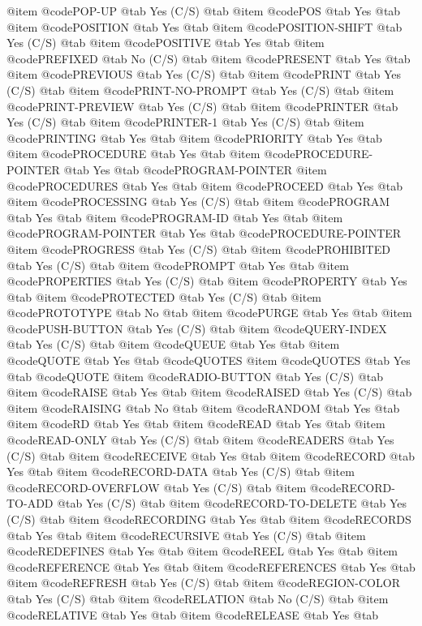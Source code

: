 @item @code{POP-UP} @tab Yes	(C/S) @tab 
@item @code{POS} @tab Yes @tab 
@item @code{POSITION} @tab Yes @tab 
@item @code{POSITION-SHIFT} @tab Yes	(C/S) @tab 
@item @code{POSITIVE} @tab Yes @tab 
@item @code{PREFIXED} @tab No	(C/S) @tab 
@item @code{PRESENT} @tab Yes @tab 
@item @code{PREVIOUS} @tab Yes	(C/S) @tab 
@item @code{PRINT} @tab Yes	(C/S) @tab 
@item @code{PRINT-NO-PROMPT} @tab Yes	(C/S) @tab 
@item @code{PRINT-PREVIEW} @tab Yes	(C/S) @tab 
@item @code{PRINTER} @tab Yes	(C/S) @tab 
@item @code{PRINTER-1} @tab Yes	(C/S) @tab 
@item @code{PRINTING} @tab Yes @tab 
@item @code{PRIORITY} @tab Yes @tab 
@item @code{PROCEDURE} @tab Yes @tab 
@item @code{PROCEDURE-POINTER} @tab Yes @tab @code{PROGRAM-POINTER}
@item @code{PROCEDURES} @tab Yes @tab 
@item @code{PROCEED} @tab Yes @tab 
@item @code{PROCESSING} @tab Yes	(C/S) @tab 
@item @code{PROGRAM} @tab Yes @tab 
@item @code{PROGRAM-ID} @tab Yes @tab 
@item @code{PROGRAM-POINTER} @tab Yes @tab @code{PROCEDURE-POINTER}
@item @code{PROGRESS} @tab Yes	(C/S) @tab 
@item @code{PROHIBITED} @tab Yes	(C/S) @tab 
@item @code{PROMPT} @tab Yes @tab 
@item @code{PROPERTIES} @tab Yes	(C/S) @tab 
@item @code{PROPERTY} @tab Yes @tab 
@item @code{PROTECTED} @tab Yes	(C/S) @tab 
@item @code{PROTOTYPE} @tab No @tab 
@item @code{PURGE} @tab Yes @tab 
@item @code{PUSH-BUTTON} @tab Yes	(C/S) @tab 
@item @code{QUERY-INDEX} @tab Yes	(C/S) @tab 
@item @code{QUEUE} @tab Yes @tab 
@item @code{QUOTE} @tab Yes @tab @code{QUOTES}
@item @code{QUOTES} @tab Yes @tab @code{QUOTE}
@item @code{RADIO-BUTTON} @tab Yes	(C/S) @tab 
@item @code{RAISE} @tab Yes @tab 
@item @code{RAISED} @tab Yes	(C/S) @tab 
@item @code{RAISING} @tab No @tab 
@item @code{RANDOM} @tab Yes @tab 
@item @code{RD} @tab Yes @tab 
@item @code{READ} @tab Yes @tab 
@item @code{READ-ONLY} @tab Yes	(C/S) @tab 
@item @code{READERS} @tab Yes	(C/S) @tab 
@item @code{RECEIVE} @tab Yes @tab 
@item @code{RECORD} @tab Yes @tab 
@item @code{RECORD-DATA} @tab Yes	(C/S) @tab 
@item @code{RECORD-OVERFLOW} @tab Yes	(C/S) @tab 
@item @code{RECORD-TO-ADD} @tab Yes	(C/S) @tab 
@item @code{RECORD-TO-DELETE} @tab Yes	(C/S) @tab 
@item @code{RECORDING} @tab Yes @tab 
@item @code{RECORDS} @tab Yes @tab 
@item @code{RECURSIVE} @tab Yes	(C/S) @tab 
@item @code{REDEFINES} @tab Yes @tab 
@item @code{REEL} @tab Yes @tab 
@item @code{REFERENCE} @tab Yes @tab 
@item @code{REFERENCES} @tab Yes @tab 
@item @code{REFRESH} @tab Yes	(C/S) @tab 
@item @code{REGION-COLOR} @tab Yes	(C/S) @tab 
@item @code{RELATION} @tab No	(C/S) @tab 
@item @code{RELATIVE} @tab Yes @tab 
@item @code{RELEASE} @tab Yes @tab 
